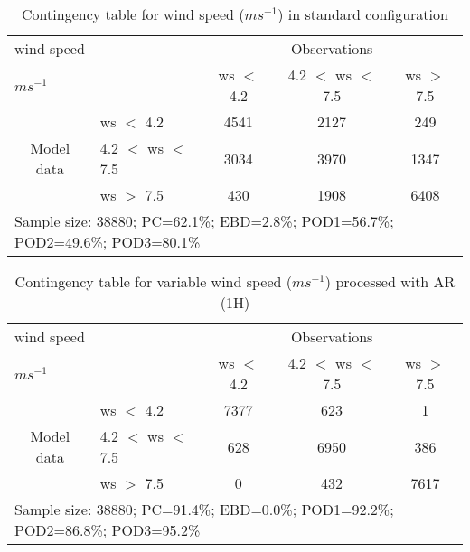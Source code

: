 \documentclass[11pt,english]{article}
\begin{document}
\clearpage
\begin{table}[]
\begin{center}
\begin{tabular}{llccc}
\hline
{wind speed}                                       &                                                    & \multicolumn{3}{c}{Observations}                 \\
{$m s^{-1}$}                                       &                             & ws $<$ 4.2   & 4.2 $<$ ws $<$ 7.5 & ws $>$ 7.5 \\
\hline
\multicolumn{1}{c}{\multirow{3}{*}{Model data}}  & ws $<$ 4.2             & 4541                & 2127                       & 249              \\
                                                 & 4.2  $<$ ws $<$ 7.5 & 3034                & 3970                       & 1347              \\
                                                 & ws $>$ 7.5             & 430                & 1908                       & 6408              \\
\hline 
\multicolumn{5}{l}{Sample size: 38880; PC=62.1\%; EBD=2.8\%; POD1=56.7\%; POD2=49.6\%; POD3=80.1\%}                 \\
\end{tabular}
\end{center}
\caption{Contingency table for {wind speed} ($m s^{-1}$) in standard configuration}
\label{tab:contingencywsBEF}
\end{table}
\begin{table}[]
\begin{center}
\begin{tabular}{llccc}
\hline
{wind speed}                                       &                                                    & \multicolumn{3}{c}{Observations}                 \\
{$m s^{-1}$}                                       &                             & ws $<$ 4.2   & 4.2 $<$ ws $<$ 7.5 & ws $>$ 7.5 \\
\hline
\multicolumn{1}{c}{\multirow{3}{*}{Model data}}  & ws $<$ 4.2             & 7377                & 623                       & 1              \\
                                                 & 4.2  $<$ ws $<$ 7.5 & 628                & 6950                       & 386              \\
                                                 & ws $>$ 7.5             & 0                & 432                       & 7617              \\
\hline 
\multicolumn{5}{l}{Sample size: 38880; PC=91.4\%; EBD=0.0\%; POD1=92.2\%; POD2=86.8\%; POD3=95.2\%}                 \\
\end{tabular}
\end{center}
\caption{Contingency table for variable wind speed ($m s^{-1}$) processed with AR (1H)}
\label{tab:contingencywsAFT}
\end{table}
\end{document}
